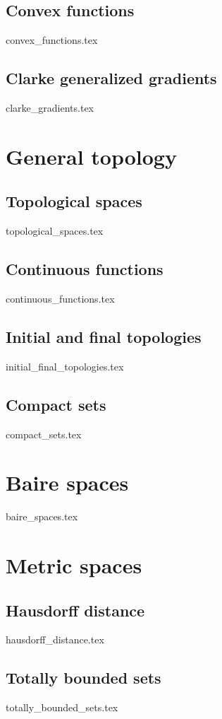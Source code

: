 \documentclass[numbers=endperiod, bibliography=totocnumbered]{scrartcl}
\begin{document}
\subsection{Convex functions}\label{sec:convex_functions}
{convex_functions.tex}
\subsection{Clarke generalized gradients}\label{sec:clarke_gradients}
{clarke_gradients.tex}

\section{General topology}\label{sec:general_topology}
\subsection{Topological spaces}\label{sec:topological_spaces}
{topological_spaces.tex}
\subsection{Continuous functions}\label{sec:continuous_functions}
{continuous_functions.tex}
\subsection{Initial and final topologies}\label{sec:initial_final_topologies}
{initial_final_topologies.tex}
\subsection{Compact sets}\label{sec:compact_sets}
{compact_sets.tex}
\section{Baire spaces}\label{sec:baire_spaces}
{baire_spaces.tex}

\section{Metric spaces}\label{sec:metric_spaces}
\subsection{Hausdorff distance}\label{sec:hausdorff_distance}
{hausdorff_distance.tex}
\subsection{Totally bounded sets}\label{sec:totally_bounded_sets}
{totally_bounded_sets.tex}
\end{document}
